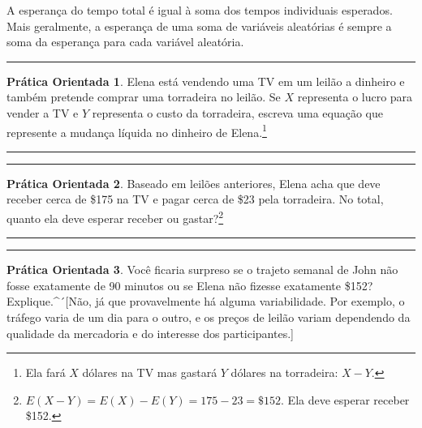 \documentclass[
]{book}
\theoremstyle{definition}
\theoremstyle{definition}
\theoremstyle{definition}
\newtheorem{exercise}{Prática Orientada}[chapter]
\theoremstyle{definition}
\theoremstyle{remark}
\begin{document}
A esperança do tempo total é igual à soma dos tempos individuais esperados. Mais geralmente, a esperança de uma soma de variáveis aleatórias é sempre a soma da esperança para cada variável aleatória.

\begin{center}\rule{0.5\linewidth}{0.5pt}\end{center}

\begin{exercise}
\protect\hypertarget{exr:elenaIsSellingATVAndBuyingAToasterOvenAtAnAuction}{}{\label{exr:elenaIsSellingATVAndBuyingAToasterOvenAtAnAuction} }Elena está vendendo uma TV em um leilão a dinheiro e também pretende comprar uma torradeira no leilão. Se \(X\) representa o lucro para vender a TV e \(Y\) representa o custo da torradeira, escreva uma equação que represente a mudança líquida no dinheiro de Elena.\footnote{Ela fará \(X\) dólares na TV mas gastará \(Y\) dólares na torradeira: \(X-Y\).}
\end{exercise}

\begin{center}\rule{0.5\linewidth}{0.5pt}\end{center}

\begin{center}\rule{0.5\linewidth}{0.5pt}\end{center}

\begin{exercise}
\protect\hypertarget{exr:unnamed-chunk-78}{}{\label{exr:unnamed-chunk-78} }Baseado em leilões anteriores, Elena acha que deve receber cerca de \$175 na TV e pagar cerca de \$23 pela torradeira. No total, quanto ela deve esperar receber ou gastar?\footnote{\(E(X-Y) = E(X) - E(Y) = 175 - 23 = \$152\). Ela deve esperar receber \$152.}
\end{exercise}

\begin{center}\rule{0.5\linewidth}{0.5pt}\end{center}

\begin{center}\rule{0.5\linewidth}{0.5pt}\end{center}

\begin{exercise}
\protect\hypertarget{exr:explainWhyThereIsUncertaintyInTheSum}{}{\label{exr:explainWhyThereIsUncertaintyInTheSum} }Você ficaria surpreso se o trajeto semanal de John não fosse exatamente de 90 minutos ou se Elena não fizesse exatamente \$152? Explique.\^{}´{[}Não, já que provavelmente há alguma variabilidade. Por exemplo, o tráfego varia de um dia para o outro, e os preços de leilão variam dependendo da qualidade da mercadoria e do interesse dos participantes.{]}
\end{exercise}
\end{document}
